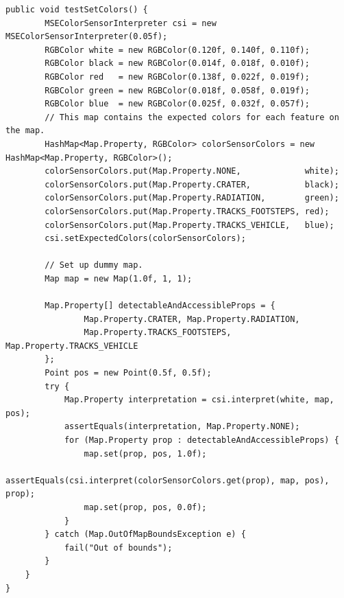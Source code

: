 \documentclass[12pt,a4paper]{article}
\begin{document}
      \begin{lstlisting}[caption=MSEColorSensorInterpreter automated test suite 2, captionpos=b, label={lst:MSEColorSensorInterpreterAutomatedTestSuite2}]
     public void testSetColors() {
        MSEColorSensorInterpreter csi = new MSEColorSensorInterpreter(0.05f);
        RGBColor white = new RGBColor(0.120f, 0.140f, 0.110f);
        RGBColor black = new RGBColor(0.014f, 0.018f, 0.010f);
        RGBColor red   = new RGBColor(0.138f, 0.022f, 0.019f);
        RGBColor green = new RGBColor(0.018f, 0.058f, 0.019f);
        RGBColor blue  = new RGBColor(0.025f, 0.032f, 0.057f);
        // This map contains the expected colors for each feature on the map.
        HashMap<Map.Property, RGBColor> colorSensorColors = new HashMap<Map.Property, RGBColor>();
        colorSensorColors.put(Map.Property.NONE,             white);
        colorSensorColors.put(Map.Property.CRATER,           black);
        colorSensorColors.put(Map.Property.RADIATION,        green);
        colorSensorColors.put(Map.Property.TRACKS_FOOTSTEPS, red);
        colorSensorColors.put(Map.Property.TRACKS_VEHICLE,   blue);
        csi.setExpectedColors(colorSensorColors);
        
        // Set up dummy map.
        Map map = new Map(1.0f, 1, 1);
        
        Map.Property[] detectableAndAccessibleProps = {
                Map.Property.CRATER, Map.Property.RADIATION,
                Map.Property.TRACKS_FOOTSTEPS, Map.Property.TRACKS_VEHICLE
        };
        Point pos = new Point(0.5f, 0.5f);
        try {
            Map.Property interpretation = csi.interpret(white, map, pos);
            assertEquals(interpretation, Map.Property.NONE);
            for (Map.Property prop : detectableAndAccessibleProps) {
                map.set(prop, pos, 1.0f);
                assertEquals(csi.interpret(colorSensorColors.get(prop), map, pos), prop);
                map.set(prop, pos, 0.0f);
            }
        } catch (Map.OutOfMapBoundsException e) {
            fail("Out of bounds");
        }
    }
}

      \end{lstlisting}
     
\end{document}
